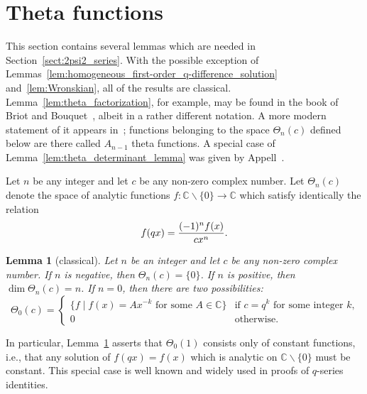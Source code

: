 \documentclass[pdftex]{sigma}
\numberwithin{equation}{section}
\newtheorem{Lemma}[Theorem]{Lemma}
\newcommand{\C}{\mathbb{C}}
\begin{document}
\section{Theta functions} \label{sect:theta}

This section contains several lemmas which are needed in Section~\ref{sect:2psi2_series}. With the possible exception of Lemmas~\ref{lem:homogeneous_first-order_q-difference_solution} and~\ref{lem:Wronskian}, all of the results are classical. Lemma~\ref{lem:theta_factorization}, for example, may be found in the book of Briot and Bouquet~\cite[p.~239]{Briot1875}, albeit in a rather different notation. A more modern statement of it appears in~\cite[Lemma~3.2]{Rosengren2006}; functions belonging to the space $\Theta_n(c)$ defined below are there called $A_{n-1}$ theta functions. A special case of Lemma~\ref{lem:theta_determinant_lemma} was given by Appell~\cite[p.~140]{Appell1884}.

\begin{Definition}
Let $n$ be any integer and let $c$ be any non-zero complex number. Let $\Theta_n(c)$ denote the space of analytic functions $f\colon \C \backslash \{0\} \rightarrow \C$ which satisfy identically the relation
\begin{equation} \label{eqn:nth_order_theta_functional_equation}
f(qx) = {(-1)^n f(x) \over cx^n}.
\end{equation}
\end{Definition}

\begin{Lemma}[classical] \label{lem:Theta_dimension}
Let $n$ be an integer and let $c$ be any non-zero complex number. If $n$ is negative, then $\Theta_n(c) = \{0\}$. If $n$ is positive, then $\dim \Theta_n(c) = n$. If $n=0$, then there are two possibilities:
\[ \Theta_0(c) = \begin{cases} \big\{f \mid f(x) = A x^{-k} \text{ for some } A \in \C\big\} &\text{if $c = q^k$ for some integer $k$,} \\
0 &\text{otherwise.}
\end{cases} \]
\end{Lemma}

\begin{Remark}
In particular, Lemma~\ref{lem:Theta_dimension} asserts that $\Theta_0(1)$ consists only of constant functions, i.e., that any solution of $f(qx)=f(x)$ which is analytic on $\C\backslash\{0\}$ must be constant. This special case is well known and widely used in proofs of $q$-series identities.
\end{Remark}
\end{document}
